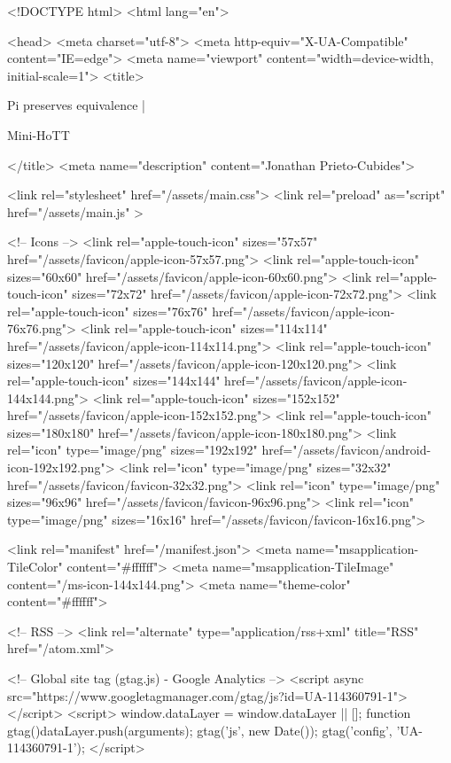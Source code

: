 <!DOCTYPE html>
<html lang="en">

<head>
  <meta charset="utf-8">
  <meta http-equiv="X-UA-Compatible" content="IE=edge">
  <meta name="viewport" content="width=device-width, initial-scale=1">
  <title>
    
      
        Pi preserves equivalence |
      
        Mini-HoTT
    
  </title>
  <meta name="description" content="Jonathan Prieto-Cubides">

  <link rel="stylesheet" href="/assets/main.css">
  <link rel="preload" as="script" href="/assets/main.js" >

  <!-- Icons -->
  <link rel="apple-touch-icon" sizes="57x57" href="/assets/favicon/apple-icon-57x57.png">
  <link rel="apple-touch-icon" sizes="60x60" href="/assets/favicon/apple-icon-60x60.png">
  <link rel="apple-touch-icon" sizes="72x72" href="/assets/favicon/apple-icon-72x72.png">
  <link rel="apple-touch-icon" sizes="76x76" href="/assets/favicon/apple-icon-76x76.png">
  <link rel="apple-touch-icon" sizes="114x114" href="/assets/favicon/apple-icon-114x114.png">
  <link rel="apple-touch-icon" sizes="120x120" href="/assets/favicon/apple-icon-120x120.png">
  <link rel="apple-touch-icon" sizes="144x144" href="/assets/favicon/apple-icon-144x144.png">
  <link rel="apple-touch-icon" sizes="152x152" href="/assets/favicon/apple-icon-152x152.png">
  <link rel="apple-touch-icon" sizes="180x180" href="/assets/favicon/apple-icon-180x180.png">
  <link rel="icon" type="image/png" sizes="192x192"  href="/assets/favicon/android-icon-192x192.png">
  <link rel="icon" type="image/png" sizes="32x32" href="/assets/favicon/favicon-32x32.png">
  <link rel="icon" type="image/png" sizes="96x96" href="/assets/favicon/favicon-96x96.png">
  <link rel="icon" type="image/png" sizes="16x16" href="/assets/favicon/favicon-16x16.png">

  <link rel="manifest" href="/manifest.json">
  <meta name="msapplication-TileColor" content="#ffffff">
  <meta name="msapplication-TileImage" content="/ms-icon-144x144.png">
  <meta name="theme-color" content="#ffffff">

  <!-- RSS -->
  <link rel="alternate" type="application/rss+xml" title="RSS" href="/atom.xml">

  <!-- Global site tag (gtag.js) - Google Analytics -->
  <script async src="https://www.googletagmanager.com/gtag/js?id=UA-114360791-1"></script>
  <script>
    window.dataLayer = window.dataLayer || [];
    function gtag(){dataLayer.push(arguments);}
    gtag('js', new Date());
    gtag('config', 'UA-114360791-1');
  </script>


